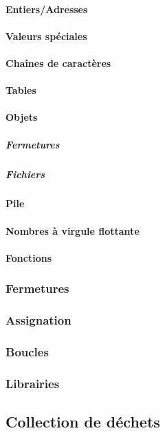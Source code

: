 \documentclass{article}
\begin{document}
\paragraph{Entiers/Adresses}
\paragraph{Valeurs spéciales}
\paragraph{Chaînes de caractères}
\paragraph{Tables}
\paragraph{Objets}
\setcounter{subparagraph}{-1}
\subparagraph{Fermetures}
\subparagraph{Fichiers}
\paragraph{Pile}
\paragraph{Nombres à virgule flottante}
\paragraph{Fonctions}

\subsubsection{Fermetures}

\subsubsection{Assignation}

\subsubsection{Boucles}

\subsubsection{Librairies}

\subsection{Collection de déchets}
\end{document}
